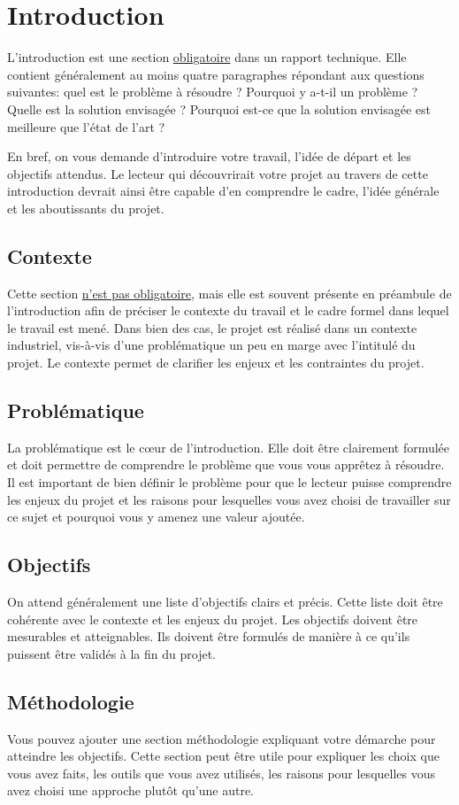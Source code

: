 \chapter{Introduction}

L'introduction est une section \underline{obligatoire} dans un rapport technique. Elle contient généralement au moins quatre paragraphes répondant aux questions suivantes: quel est le problème à résoudre ? Pourquoi y a-t-il un problème ? Quelle est la solution envisagée ? Pourquoi est-ce que la solution envisagée est meilleure que l'état de l'art ?

En bref, on vous demande d'introduire votre travail, l'idée de départ et les objectifs attendus. Le lecteur qui découvrirait votre projet au travers de cette introduction devrait ainsi être capable d'en comprendre le cadre, l'idée générale et les aboutissants du projet.

\section{Contexte}

Cette section \underline{n'est pas obligatoire}, mais elle est souvent présente en préambule de l'introduction afin de préciser le contexte du travail \cad et le cadre formel dans lequel le travail est mené. Dans bien des cas, le projet est réalisé dans un contexte industriel, vis-à-vis d'une problématique un peu en marge avec l'intitulé du projet. Le contexte permet de clarifier les enjeux et les contraintes du projet.

\section{Problématique}

La problématique est le cœur de l'introduction. Elle doit être clairement formulée et doit permettre de comprendre le problème que vous vous apprêtez à résoudre. Il est important de bien définir le problème pour que le lecteur puisse comprendre les enjeux du projet et les raisons pour lesquelles vous avez choisi de travailler sur ce sujet et pourquoi vous y amenez une valeur ajoutée.

\section{Objectifs}

On attend généralement une liste d'objectifs clairs et précis. Cette liste doit être cohérente avec le contexte et les enjeux du projet. Les objectifs doivent être mesurables et atteignables. Ils doivent être formulés de manière à ce qu'ils puissent être validés à la fin du projet.

\section{Méthodologie}

Vous pouvez ajouter une section méthodologie expliquant votre démarche pour atteindre les objectifs. Cette section peut être utile pour expliquer les choix que vous avez faits, les outils que vous avez utilisés, les raisons pour lesquelles vous avez choisi une approche plutôt qu'une autre.
